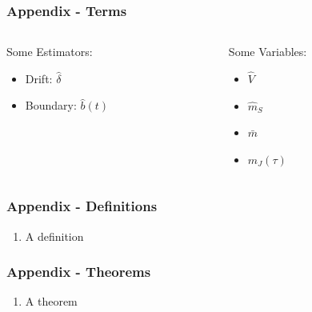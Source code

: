 \documentclass[
    11pt, %
    aspectratio=169, %
]{beamer}
\begin{document}
\begin{frame}[noframenumbering]
\label{Terms}
	\frametitle{Appendix - Terms}

        \begin{columns}[t] %
		\begin{column}{0.5\textwidth} %
                Some Estimators:
                \begin{itemize}
                    \item Drift: $\hat{\delta}$
                    \item Boundary: $\hat{b}(t)$
                \end{itemize}
		\end{column}
  		\begin{column}{0.5\textwidth} %
                Some Variables:
                \begin{itemize}
                    \item $\hat{V}$
                    \item $\hat{m}_S$
                    \item $\bar{m}$
                    \item $m_J(\tau)$\newline\newline
                \end{itemize}
		\end{column}
	\end{columns}
        \hyperlink{Test Stat}{}        
\end{frame}

\begin{frame}[noframenumbering]
\label{Definitions}
	\frametitle{Appendix - Definitions}
         \begin{enumerate}
             \item A definition \newline
         \end{enumerate}
         
        \hyperlink{Test Stat}{}
\end{frame}

\begin{frame}[noframenumbering]
\label{Theorems}
	\frametitle{Appendix - Theorems}
         \begin{enumerate}
             \item A theorem\newline
         \end{enumerate}
         
        \hyperlink{Test Stat}{}        
\end{frame}
\end{document}
